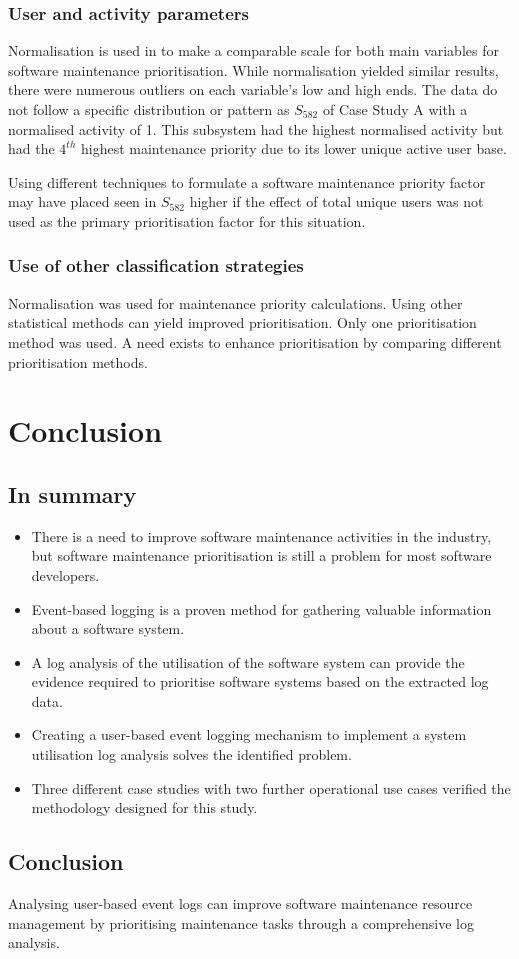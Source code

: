 \subsubsection{User and activity parameters}
\par Normalisation is used in  to make a comparable scale for both main variables for software maintenance prioritisation. While normalisation yielded similar results, there were numerous outliers on each variable's low and high ends. The data do not follow a specific distribution or pattern as $S_{582}$ of Case Study A with a normalised activity of 1. This subsystem had the highest normalised activity but had the $4^{th}$ highest maintenance priority due to its lower unique active user base. \par Using different techniques to formulate a software maintenance priority factor may have placed seen in $S_{582}$ higher if the effect of total unique users was not used as the primary prioritisation factor for this situation. 

\subsubsection{Use of other classification strategies}
Normalisation was used for maintenance priority calculations. Using other statistical methods can yield improved prioritisation. Only one prioritisation method was used. A need exists to enhance prioritisation by comparing different prioritisation methods.

\section{Conclusion}

\subsection{In summary}
\begin{itemize}
	\item There is a need to improve software maintenance activities in the industry, but software maintenance prioritisation is still a problem for most software developers.
	\item Event-based logging is a proven method for gathering valuable information about a software system.
	\item A log analysis of the utilisation of the software system can provide the evidence required to prioritise software systems based on the extracted log data.
	\item Creating a user-based event logging mechanism to implement a system utilisation log analysis solves the identified problem.
	\item Three different case studies with two further operational use cases verified the methodology designed for this study.
\end{itemize}

\subsection{Conclusion}
Analysing user-based event logs can improve software maintenance resource management by prioritising maintenance tasks through a comprehensive log analysis.